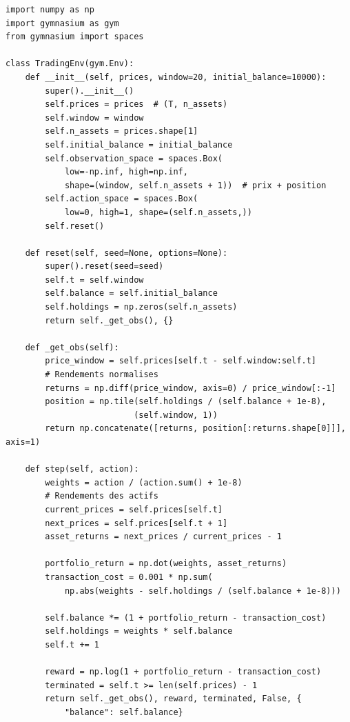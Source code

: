 \begin{codeblock}[title=\textbf{Environnement de trading simplifi\'e}]
\begin{verbatim}
import numpy as np
import gymnasium as gym
from gymnasium import spaces

class TradingEnv(gym.Env):
    def __init__(self, prices, window=20, initial_balance=10000):
        super().__init__()
        self.prices = prices  # (T, n_assets)
        self.window = window
        self.n_assets = prices.shape[1]
        self.initial_balance = initial_balance
        self.observation_space = spaces.Box(
            low=-np.inf, high=np.inf,
            shape=(window, self.n_assets + 1))  # prix + position
        self.action_space = spaces.Box(
            low=0, high=1, shape=(self.n_assets,))
        self.reset()

    def reset(self, seed=None, options=None):
        super().reset(seed=seed)
        self.t = self.window
        self.balance = self.initial_balance
        self.holdings = np.zeros(self.n_assets)
        return self._get_obs(), {}

    def _get_obs(self):
        price_window = self.prices[self.t - self.window:self.t]
        # Rendements normalises
        returns = np.diff(price_window, axis=0) / price_window[:-1]
        position = np.tile(self.holdings / (self.balance + 1e-8),
                          (self.window, 1))
        return np.concatenate([returns, position[:returns.shape[0]]], axis=1)

    def step(self, action):
        weights = action / (action.sum() + 1e-8)
        # Rendements des actifs
        current_prices = self.prices[self.t]
        next_prices = self.prices[self.t + 1]
        asset_returns = next_prices / current_prices - 1

        portfolio_return = np.dot(weights, asset_returns)
        transaction_cost = 0.001 * np.sum(
            np.abs(weights - self.holdings / (self.balance + 1e-8)))

        self.balance *= (1 + portfolio_return - transaction_cost)
        self.holdings = weights * self.balance
        self.t += 1

        reward = np.log(1 + portfolio_return - transaction_cost)
        terminated = self.t >= len(self.prices) - 1
        return self._get_obs(), reward, terminated, False, {
            "balance": self.balance}
\end{verbatim}
\end{codeblock}


